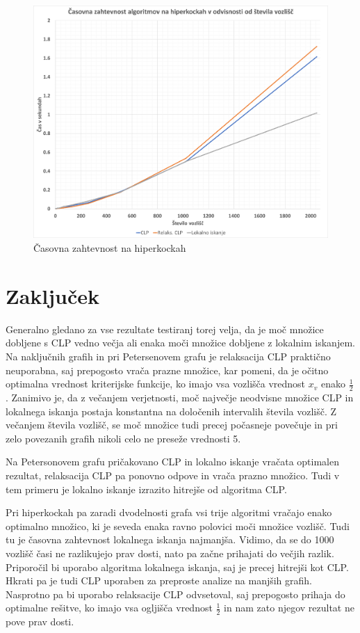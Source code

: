 \documentclass[a4paper, 12 pt]{article}
\theoremstyle{definition}
\theoremstyle{plain}
\theoremstyle{remark}
\begin{document}
\begin{figure}[H]
\centering
  \includegraphics[scale=0.30]{./Slike/Casovna_zahtevnost_hiperkocke.png}
  \caption{Časovna zahtevnost na hiperkockah}
\end{figure}

\section{Zaključek}
Generalno gledano za vse rezultate testiranj torej velja, da je moč množice dobljene s CLP vedno večja ali enaka moči množice dobljene z lokalnim iskanjem. Na naključnih grafih in pri Petersenovem grafu je relaksacija CLP praktično neuporabna, saj prepogosto vrača prazne množice, kar pomeni, da je očitno optimalna vrednost kriterijske funkcije, ko imajo vsa vozlišča vrednost $x_v$ enako $\frac{1}{2}$. Zanimivo je, da z večanjem verjetnosti, moč največje neodvisne množice CLP in lokalnega iskanja postaja konstantna na določenih intervalih števila vozlišč. Z večanjem števila vozlišč, se moč množice tudi precej počasneje povečuje in pri zelo povezanih grafih nikoli celo ne preseže vrednosti 5.

Na Petersonovem grafu pričakovano CLP in lokalno iskanje vračata optimalen rezultat, relaksacija CLP pa ponovno odpove in vrača prazno množico. Tudi v tem primeru je lokalno iskanje izrazito hitrejše od algoritma CLP.

Pri hiperkockah pa zaradi dvodelnosti grafa vsi trije algoritmi vračajo enako optimalno množico, ki je seveda enaka ravno polovici moči množice vozlišč. Tudi tu je časovna zahtevnost lokalnega iskanja najmanjša. Vidimo, da se do 1000 vozlišč časi ne razlikujejo prav dosti, nato pa začne prihajati do večjih razlik.\\

Priporočil bi uporabo algoritma lokalnega iskanja, saj je precej hitrejši kot CLP. Hkrati pa je tudi CLP uporaben za preproste analize na manjših grafih. Nasprotno pa bi uporabo relaksacije CLP odvsetoval, saj prepogosto prihaja do optimalne rešitve, ko imajo vsa ogljišča vrednost $\frac{1}{2}$ in nam zato njegov rezultat ne pove prav dosti.


\end{document}
